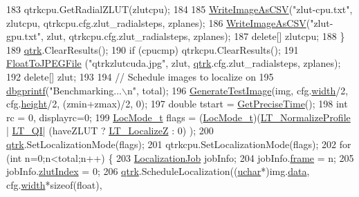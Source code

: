 \begin{DoxyCode}
183         qtrkcpu.GetRadialZLUT(zlutcpu);
184         
185         \hyperlink{utils_8cpp_ad594d63fab5898e75c6eeb533368aba8}{WriteImageAsCSV}(\textcolor{stringliteral}{"zlut-cpu.txt"}, zlutcpu, qtrkcpu.cfg.zlut\_radialsteps, zplanes);
186         \hyperlink{utils_8cpp_ad594d63fab5898e75c6eeb533368aba8}{WriteImageAsCSV}(\textcolor{stringliteral}{"zlut-gpu.txt"}, zlut, qtrkcpu.cfg.zlut\_radialsteps, zplanes);
187         \textcolor{keyword}{delete}[] zlutcpu;
188     \}
189     \hyperlink{namespaceqtrk}{qtrk}.ClearResults();
190     \textcolor{keywordflow}{if} (cpucmp) qtrkcpu.ClearResults();
191     \hyperlink{fastjpg_8cpp_a197d79f00fb185491c4d109e966ca9ef}{FloatToJPEGFile} (\textcolor{stringliteral}{"qtrkzlutcuda.jpg"}, zlut, \hyperlink{namespaceqtrk}{qtrk}.cfg.zlut\_radialsteps, zplanes);
192     \textcolor{keyword}{delete}[] zlut;
193     
194     \textcolor{comment}{// Schedule images to localize on}
195     \hyperlink{utils_8cpp_a4a7132c90e490d24edecb391a754a9c0}{dbgprintf}(\textcolor{stringliteral}{"Benchmarking...\(\backslash\)n"}, total);
196     \hyperlink{utils_8cpp_a2bb752417033483e1acda83da3bc800e}{GenerateTestImage}(img, cfg.\hyperlink{struct_q_trk_settings_aef24eb3a4692bd67ff1aca8ef950e08d}{width}/2, cfg.\hyperlink{struct_q_trk_settings_a94c965d103e7a0a4f1fced8eee1324ce}{height}/2, (zmin+zmax)/2, 0);
197     \textcolor{keywordtype}{double} tstart = \hyperlink{utils_8cpp_a11abc9edca3542dd4e74dadf99340fa1}{GetPreciseTime}();
198     \textcolor{keywordtype}{int} rc = 0, displayrc=0;
199     \hyperlink{qtrk__c__api_8h_a6ba72ec1daa19642f85a47defe8f0812}{LocMode\_t} flags = (\hyperlink{qtrk__c__api_8h_a6ba72ec1daa19642f85a47defe8f0812}{LocMode\_t})(\hyperlink{qtrk__c__api_8h_a9d32512eae44894026802d1a688c7e3bae1cac6e7cc97db83708edd0407e3e25f}{LT\_NormalizeProfile} |
      \hyperlink{qtrk__c__api_8h_a9d32512eae44894026802d1a688c7e3ba9eb0441a0c1e1086ff81512ea509e564}{LT\_QI}| (haveZLUT ? \hyperlink{qtrk__c__api_8h_a9d32512eae44894026802d1a688c7e3ba5bee529eb0d2fa3bef01f31eeb613b92}{LT\_LocalizeZ} : 0) );
200     \hyperlink{namespaceqtrk}{qtrk}.SetLocalizationMode(flags);
201     qtrkcpu.SetLocalizationMode(flags);
202     \textcolor{keywordflow}{for} (\textcolor{keywordtype}{int} n=0;n<total;n++) \{
203         \hyperlink{struct_localization_job}{LocalizationJob} jobInfo;
204         jobInfo.\hyperlink{struct_localization_job_a54df1ba33ab48b20dca664142a8cf619}{frame} = n;
205         jobInfo.\hyperlink{struct_localization_job_afcf9f91b72597af0e2572f3ae74d9a99}{zlutIndex} = 0;
206         \hyperlink{namespaceqtrk}{qtrk}.ScheduleLocalization((\hyperlink{std__incl_8h_a65f85814a8290f9797005d3b28e7e5fc}{uchar}*)img.\hyperlink{struct_t_image_data_a78c7415ecee3965da7e25149cea6f4d8}{data}, cfg.\hyperlink{struct_q_trk_settings_aef24eb3a4692bd67ff1aca8ef950e08d}{width}*\textcolor{keyword}{sizeof}(\textcolor{keywordtype}{float}), 

\end{DoxyCode}
